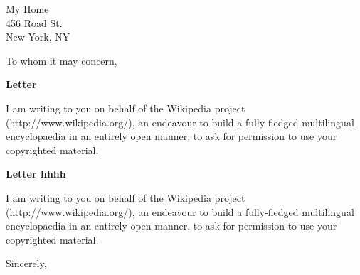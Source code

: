 \documentclass[a4paper, 12pt]{letter}
\newcommand{\section}[1]{\begin{center}\Large\textbf{#1}\end{center}}
\begin{document}
\begin{letter}
{
    My Home\\456 Road St.\\New York, NY
}

\opening{To whom it may concern,}


\section{Letter}\label{letter}

I am writing to you on behalf of the Wikipedia project
(http://www.wikipedia.org/), an endeavour to build a fully-fledged
multilingual encyclopaedia in an entirely open manner, to ask for
permission to use your copyrighted material.

\section{Letter hhhh}\label{letterjhhh}

I am writing to you on behalf of the Wikipedia project
(http://www.wikipedia.org/), an endeavour to build a fully-fledged
multilingual encyclopaedia in an entirely open manner, to ask for
permission to use your copyrighted material.

\longindentation=0pt
\closing{Sincerely,}

\end{letter}
\end{document}
